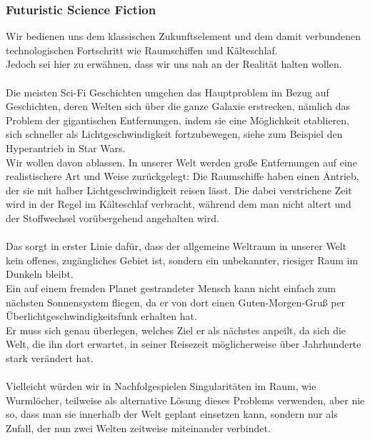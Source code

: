 \documentclass[12pt]{article}
\begin{document}
	\subsubsection{Futuristic Science Fiction}
	Wir bedienen uns dem klassischen Zukunftselement und dem damit verbundenen technologischen Fortschritt wie Raumschiffen und Kälteschlaf.\\
	Jedoch sei hier zu erwähnen, dass wir uns nah an der Realität halten wollen.\\\\
	Die meisten Sci-Fi Geschichten umgehen das Hauptproblem im Bezug auf Geschichten, deren Welten sich über die
	ganze Galaxie erstrecken, nämlich  das Problem der gigantischen Entfernungen, indem sie eine Möglichkeit
	etablieren, sich schneller als Lichtgeschwindigkeit fortzubewegen, siehe zum Beispiel den Hyperantrieb in Star Wars.\\
	Wir wollen davon ablassen. In unserer Welt werden große Entfernungen auf eine realistischere Art und Weise zurückgelegt: Die Raumschiffe haben einen Antrieb, der sie mit halber Lichtgeschwindigkeit reisen lässt. Die dabei verstrichene Zeit wird in der Regel im Kälteschlaf verbracht, während dem man nicht altert und der Stoffwechsel vorübergehend angehalten wird.\\
	\\
	Das sorgt in erster Linie dafür, dass der allgemeine Weltraum in unserer Welt kein offenes, zugängliches Gebiet ist, sondern ein unbekannter, riesiger Raum im Dunkeln bleibt.\\
	Ein auf einem fremden Planet gestrandeter Mensch kann nicht einfach zum nächsten Sonnensystem fliegen, da er von dort einen Guten-Morgen-Gruß per Überlichtgeschwindigkeitsfunk erhalten hat.\\
	Er muss sich genau überlegen, welches Ziel er als nächstes anpeilt, da sich die Welt, die ihn dort erwartet, in seiner Reisezeit möglicherweise über Jahrhunderte stark verändert hat.\\
	\\
	Vielleicht würden wir in Nachfolgespielen Singularitäten im Raum, wie Wurmlöcher, teilweise als alternative Lösung dieses Problems verwenden, aber nie so, dass man sie innerhalb der Welt geplant einsetzen kann, sondern nur als Zufall, der nun zwei Welten zeitweise miteinander verbindet.
	
\end{document}
